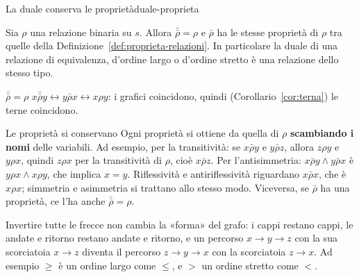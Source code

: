\begin{concetto}
\begin{Proposizione}{La duale conserva le proprietà}{duale-proprieta}
    \begin{prerequisiti}
    \end{prerequisiti}
    Sia $\rho$ una relazione binaria su $s$. Allora $\bar{\bar{\rho}} = \rho$ e $\bar{\rho}$ ha le stesse proprietà di $\rho$ tra quelle
    della Definizione~\ref{def:proprieta-relazioni}. In particolare la duale di una relazione di equivalenza, d'ordine largo o
    d'ordine stretto è una relazione dello stesso tipo.
\end{Proposizione}
\begin{dimostrazione}
    \begin{caso}{$\bar{\bar{\rho}} = \rho$}
        $x \bar{\bar{\rho}} y \leftrightarrow y \bar{\rho} x \leftrightarrow x \rho y$: i grafici coincidono, quindi (Corollario~\ref{cor:terna}) le terne coincidono.
    \end{caso}
    \begin{caso}{Le proprietà si conservano}
        Ogni proprietà si ottiene da quella di $\rho$ \textbf{scambiando i nomi} delle variabili. Ad esempio, per la transitività:
        se $x \bar{\rho} y$ e $y \bar{\rho} z$, allora $z \rho y$ e $y \rho x$, quindi $z \rho x$ per la transitività di $\rho$, cioè
        $x \bar{\rho} z$. Per l'antisimmetria: $x \bar{\rho} y \wedge y \bar{\rho} x$ è $y \rho x \wedge x \rho y$, che implica $x = y$.
        Riflessività e antiriflessività riguardano $x \bar{\rho} x$, che è $x \rho x$; simmetria e asimmetria si trattano allo stesso modo.
        Viceversa, se $\bar{\rho}$ ha una proprietà, ce l'ha anche $\bar{\bar{\rho}} = \rho$.
    \end{caso}
\end{dimostrazione}
\end{concetto}

\begin{spiegazione}
    Invertire tutte le frecce non cambia la «forma» del grafo: i cappi restano cappi, le andate e ritorno restano andate e
    ritorno, e un percorso $x \to y \to z$ con la sua scorciatoia $x \to z$ diventa il percorso $z \to y \to x$ con la scorciatoia
    $z \to x$. Ad esempio $\geq$ è un ordine largo come $\leq$, e $>$ un ordine stretto come $<$.
\end{spiegazione}

